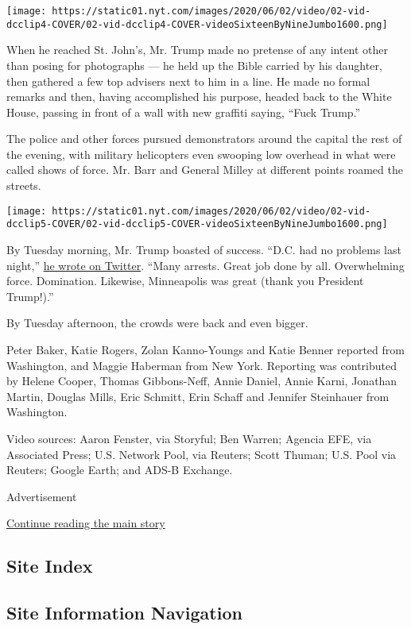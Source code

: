 \texttt{[image: https://static01.nyt.com/images/2020/06/02/video/02-vid-dcclip4-COVER/02-vid-dcclip4-COVER-videoSixteenByNineJumbo1600.png]}

When he reached St. John's, Mr. Trump made no pretense of any intent
other than posing for photographs --- he held up the Bible carried by
his daughter, then gathered a few top advisers next to him in a line. He
made no formal remarks and then, having accomplished his purpose, headed
back to the White House, passing in front of a wall with new graffiti
saying, ``Fuck Trump.''

The police and other forces pursued demonstrators around the capital the
rest of the evening, with military helicopters even swooping low
overhead in what were called shows of force. Mr. Barr and General Milley
at different points roamed the streets.

\texttt{[image: https://static01.nyt.com/images/2020/06/02/video/02-vid-dcclip5-COVER/02-vid-dcclip5-COVER-videoSixteenByNineJumbo1600.png]}

By Tuesday morning, Mr. Trump boasted of success. ``D.C. had no problems
last night,''
\href{https://twitter.com/realDonaldTrump/status/1267808120136511489}{he
wrote on Twitter}. ``Many arrests. Great job done by all. Overwhelming
force. Domination. Likewise, Minneapolis was great (thank you President
Trump!).''

By Tuesday afternoon, the crowds were back and even bigger.

Peter Baker, Katie Rogers, Zolan Kanno-Youngs and Katie Benner reported
from Washington, and Maggie Haberman from New York. Reporting was
contributed by Helene Cooper, Thomas Gibbons-Neff, Annie Daniel, Annie
Karni, Jonathan Martin, Douglas Mills, Eric Schmitt, Erin Schaff and
Jennifer Steinhauer from Washington.

Video sources: Aaron Fenster, via Storyful; Ben Warren; Agencia EFE, via
Associated Press; U.S. Network Pool, via Reuters; Scott Thuman; U.S.
Pool via Reuters; Google Earth; and ADS-B Exchange.

Advertisement

\protect\hyperlink{after-bottom}{Continue reading the main story}

\hypertarget{site-index}{%
\subsection{Site Index}\label{site-index}}

\hypertarget{site-information-navigation}{%
\subsection{Site Information
Navigation}\label{site-information-navigation}}

